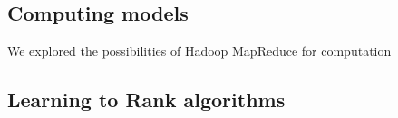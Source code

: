 \subsection{Computing models}
We explored the possibilities of Hadoop MapReduce for computation

\subsection{Learning to Rank algorithms}